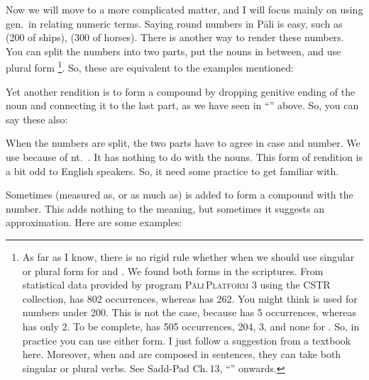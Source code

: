 Now we will move to a more complicated matter, and I will focus mainly on using gen.\ in relating numeric terms. Saying round numbers in P\=ali is easy, such as  (200 of ships),  (300 of horses). There is another way to render these numbers. You can split the numbers into two parts, put the nouns in between, and use plural form \footnote{As far as I know, there is no rigid rule whether when we should use singular or plural form for  and . We found both forms in the scriptures. From statistical data provided by program \textsc{P\=ali\,Platform} 3 using the CSTR collection,  has 802 occurrences, whereas  has 262. You might think  is used for numbers under 200. This is not the case, because  has 5 occurrences, whereas  has only 2. To be complete,  has 505 occurrences,  204,  3, and none for . So, in practice you can use either form. I just follow a suggestion from a textbook here. Moreover, when  and  are composed in sentences, they can take both singular or plural verbs. See Sadd-Pad Ch.\,13, ``'' onwards.}. So, these are equivalent to the examples mentioned:


Yet another rendition is to form a compound by dropping genitive ending of the noun and connecting it to the last part, as we have seen in ``'' above. So, you can say these also:


When the numbers are split, the two parts have to agree in case and number. We use  because of nt.\ . It has nothing to do with the nouns. This form of rendition is a bit odd to English speakers. So, it need some practice to get familiar with.

Sometimes  (measured as, or as much as) is added to form a compound with the number. This adds nothing to the meaning, but sometimes it suggests an approximation. Here are some examples:

